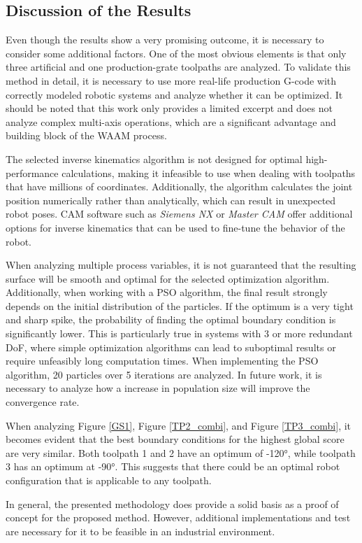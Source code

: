 







\subsection{Discussion of the Results}%


Even though the results show a very promising outcome, it is necessary to consider some additional factors. One of the most obvious elements is that only three artificial and one production-grate toolpaths are analyzed. To validate this method in detail, it is necessary to use more real-life production G-code with correctly modeled robotic systems and analyze whether it can be optimized. It should be noted that this work only provides a limited excerpt and does not analyze complex multi-axis operations, which are a significant advantage and building block of the \acrshort{WAAM} process.

The selected inverse kinematics algorithm is not designed for optimal high-performance calculations, making it infeasible to use when dealing with toolpaths that have millions of coordinates. Additionally, the algorithm calculates the joint position numerically rather than analytically, which can result in unexpected robot poses. \acrshort{CAM} software such as \textit{Siemens NX} or \textit{Master CAM} offer additional options for inverse kinematics that can be used to fine-tune the behavior of the robot.

When analyzing multiple process variables, it is not guaranteed that the resulting surface will be smooth and optimal for the selected optimization algorithm. Additionally, when working with a \acrshort{PSO} algorithm, the final result strongly depends on the initial distribution of the particles. If the optimum is a very tight and sharp spike, the probability of finding the optimal boundary condition is significantly lower. This is particularly true in systems with 3 or more redundant \acrshort{DoF}, where simple optimization algorithms can lead to suboptimal results or require unfeasibly long computation times. When implementing the \acrshort{PSO} algorithm, 20 particles over 5 iterations are analyzed. In future work, it is necessary to analyze how a increase in population size will improve the convergence rate. 

When analyzing Figure \ref{GS1}, Figure \ref{TP2_combi}, and Figure \ref{TP3_combi}, it becomes evident that the best boundary conditions for the highest global score are very similar. Both toolpath 1 and 2 have an optimum of -120°, while toolpath 3 has an optimum at -90°. This suggests that there could be an optimal robot configuration that is applicable to any toolpath.

In general, the presented methodology does provide a solid basis as a proof of concept for the proposed method. However, additional implementations and test are necessary for it to be feasible in an industrial environment.
